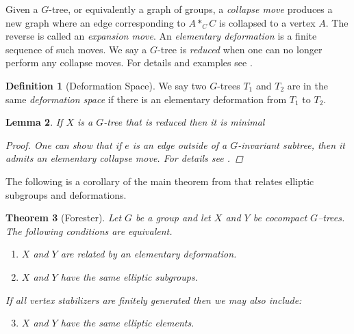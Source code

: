 \documentclass[12pt,parskip=full]{report}
\theoremstyle{plain}
\newtheorem{thm}{Theorem}[section]
\newtheorem{lem}[thm]{Lemma}
\theoremstyle{definition}
\newtheorem{dfn}[thm]{Definition}
\begin{document}
Given a \(G\)-tree, or equivalently a graph of groups, a \emph{collapse move} produces a new graph where an edge corresponding to \(A*_CC\) is collapsed to a vertex \(A\). The reverse is called an \emph{expansion move}. An \emph{elementary deformation} is a finite sequence of such moves. We say a \(G\)-tree is \emph{reduced} when one can no longer perform any collapse moves. For details and examples see \cite{foresterdeformationrigidity}.

\begin{dfn}
    [Deformation Space]
    We say two \(G\)-trees \(T_1\) and \(T_2\) are in the same \emph{deformation space} if there is an elementary deformation from \(T_1\) to \(T_2\).
\end{dfn}







\begin{lem}
    \label{reducedcocompact}
    If \(X\) is a \(G\)-tree that is reduced then it is minimal
    \begin{proof}
    One can show that if \(e\) is an edge outside of a \(G\)-invariant subtree, then it admits an elementary collapse move. For details see \cite{foresterdeformationrigidity}.
    \end{proof}
\end{lem}

The following is a corollary of the main theorem from \cite{foresterdeformationrigidity} that relates elliptic subgroups and deformations.

\begin{thm} [Forester]
    \label{thm:forester}
    Let \(G\) be a group and let \(X\) and \(Y\) be cocompact \(G\)–trees. The following conditions are equivalent.
    \begin{enumerate}
        \item \(X\) and \(Y\) are related by an elementary deformation. 
        \item \(X\) and \(Y\) have the same elliptic subgroups.
    \end{enumerate}
If all vertex stabilizers are finitely generated then we may also include:
\begin{enumerate}
    \setcounter{enumi}{2}
    \item \(X\) and \(Y\) have the same elliptic elements.
\end{enumerate}
\end{thm}
\end{document}
